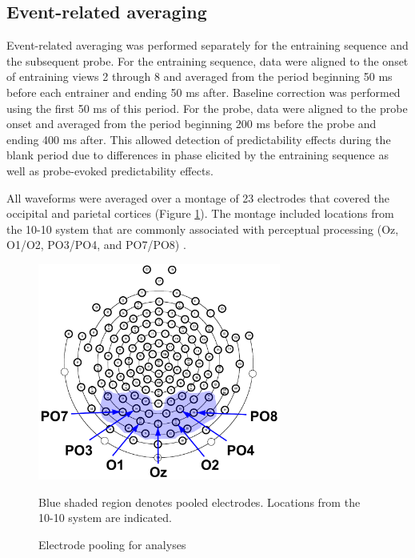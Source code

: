 \documentclass[dwyatte_dissertation.tex]{subfiles}
\begin{document}
\subsection{Event-related averaging}
Event-related averaging was performed separately for the entraining sequence and the subsequent probe. For the entraining sequence, data were aligned to the onset of entraining views 2 through 8 and averaged from the period beginning 50 ms before each entrainer and ending 50 ms after. Baseline correction was performed using the first 50 ms of this period. For the probe, data were aligned to the probe onset and averaged from the period beginning 200 ms before the probe and ending 400 ms after. This allowed detection of predictability effects during the blank period due to differences in phase elicited by the entraining sequence as well as probe-evoked predictability effects.

All waveforms were averaged over a montage of 23 electrodes that covered the occipital and parietal cortices (Figure \ref{fig:pleast_channels}). The montage included locations from the 10-10 system that are commonly associated with perceptual processing (Oz, O1/O2, PO3/PO4, and PO7/PO8) \cite[e.g.,]{DohertyRaoMesulamEtAl05,RohenkohlNobre11,FahrenfortScholteLamme07}.

\begin{figure}[h!]
\begin{center}
\includegraphics[width=80mm]{figs/chap_pleast/channels_all.pdf}
\end{center}
\caption{Electrode pooling for analyses}{Blue shaded region denotes pooled electrodes. Locations from the 10-10 system are indicated.}
\label{fig:pleast_channels}
\end{figure}
\end{document}
